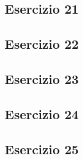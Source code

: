 \subsection{Esercizio 21}


\subsection{Esercizio 22}


\subsection{Esercizio 23}


\subsection{Esercizio 24}


\subsection{Esercizio 25}

